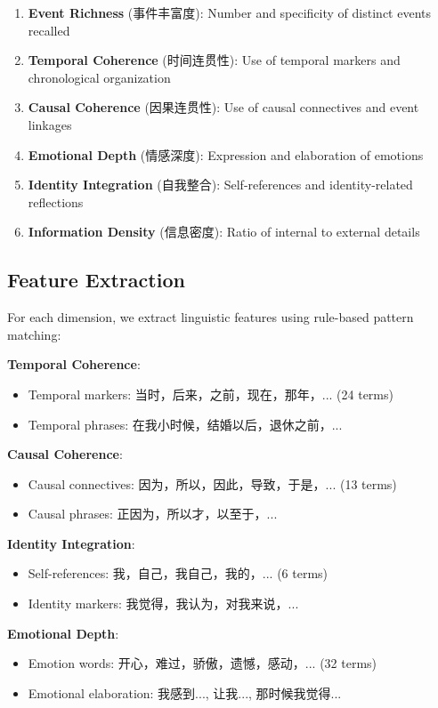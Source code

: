 \documentclass[11pt]{article}
\begin{document}
\begin{enumerate}
  \item \textbf{Event Richness} (事件丰富度): Number and specificity of distinct events recalled
  \item \textbf{Temporal Coherence} (时间连贯性): Use of temporal markers and chronological organization
  \item \textbf{Causal Coherence} (因果连贯性): Use of causal connectives and event linkages
  \item \textbf{Emotional Depth} (情感深度): Expression and elaboration of emotions
  \item \textbf{Identity Integration} (自我整合): Self-references and identity-related reflections
  \item \textbf{Information Density} (信息密度): Ratio of internal to external details
\end{enumerate}

\subsection{Feature Extraction}

For each dimension, we extract linguistic features using rule-based pattern matching:

\textbf{Temporal Coherence}:
\begin{itemize}
  \item Temporal markers: 当时，后来，之前，现在，那年，... (24 terms)
  \item Temporal phrases: 在我小时候，结婚以后，退休之前，...
\end{itemize}

\textbf{Causal Coherence}:
\begin{itemize}
  \item Causal connectives: 因为，所以，因此，导致，于是，... (13 terms)
  \item Causal phrases: 正因为，所以才，以至于，...
\end{itemize}

\textbf{Identity Integration}:
\begin{itemize}
  \item Self-references: 我，自己，我自己，我的，... (6 terms)
  \item Identity markers: 我觉得，我认为，对我来说，...
\end{itemize}

\textbf{Emotional Depth}:
\begin{itemize}
  \item Emotion words: 开心，难过，骄傲，遗憾，感动，... (32 terms)
  \item Emotional elaboration: 我感到..., 让我..., 那时候我觉得...
\end{itemize}
\end{document}
